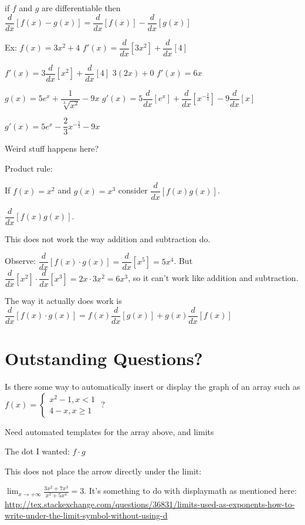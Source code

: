 \documentclass[12pt]{article}
\begin{document}
if $f$ and $g$ are differentiable then $\dfrac{d}{dx} \left[ f(x)-g(x) \right] =  \dfrac{d}{dx} \left[ f(x)
\right] - \dfrac{d}{dx} \left[ g(x) \right]$


Ex: $f(x) = 3x^{2}+4$
$f'(x) = \dfrac{d}{dx} \left[ 3x^{2} \right] + \dfrac{d}{dx} \left[ 4 \right] $

$f'(x) = 3\dfrac{d}{dx} \left[ x^{2} \right] + \dfrac{d}{dx} \left[ 4 \right] $
$3(2x)+0$
$f'(x) = 6x$

$g(x) = 5e^{x} +\dfrac{1}{\sqrt[3]{x^{2}}}-9x$
$g'(x) = 5\dfrac{d}{dx} \left[e^{x} \right] + \dfrac{d}{dx} \left[ x^{-\frac{2}{3}} \right] - 9 \dfrac{d}{dx}
\left[ x\right] $

$g'(x) = 5e^{x} - \dfrac{2}{3}x^{-\frac{5}{3}} - 9x$

Weird stuff happens here?


Product rule:

If $f(x) = x^{2}$ and $g(x)=x^{3}$ consider $\dfrac{d}{dx} \left[f(x)g(x) \right]$.

$\dfrac{d}{dx} \left[f(x)g(x) \right]$.

This does not work the way addition and subtraction do.

Observe: $\dfrac{d}{dx} \left[f(x) \cdot g(x) \right] = \dfrac{d}{dx} \left[x^{5} \right] = 5x^{4}$.
But $\dfrac{d}{dx} \left[x^{2} \right] \cdot \dfrac{d}{dx} \left[x^{3} \right] = 2x \cdot 3x^{2} = 6x^{3}$, so
it can't work like addition and subtraction.

The way it actually does work is $\dfrac{d}{dx} \left[f(x) \cdot g(x) \right] = f(x)\dfrac{d}{dx}\left[g(x) \right] + g(x)\dfrac{d}{dx}\left[f(x) \right]$

\section{Outstanding Questions?}

Is there some way to automatically insert or display the graph of an array such as $f(x) = \left\{\begin{array}{l}
x^2-1,x < 1\\
4-x, x \geq 1
\end{array} \right. $ ?

Need automated templates for the array above, and limits

The dot I wanted: $f\cdot g$

This does not place the arrow directly under the limit:


$ \lim_{x \to +\infty} \frac{3x^2 +7x^3}{x^2 +5x^4} = 3. $
It's something to do with displaymath as mentioned here:
\url{http://tex.stackexchange.com/questions/36831/limits-used-as-exponents-how-to-write-under-the-limit-symbol-without-using-d}
\end{document}
